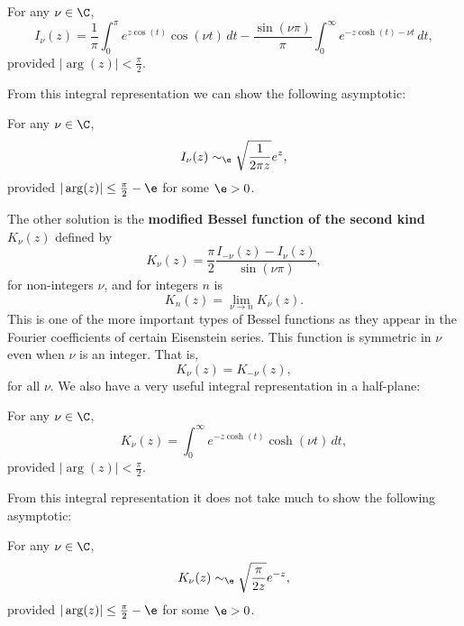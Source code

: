     \begin{proposition}\label{prop:integral_representation_I-Bessel_function}
      For any $\nu \in \C$,
      \[
        I_{\nu}(z) = \frac{1}{\pi}\int_{0}^{\pi}e^{z\cos(t)}\cos(\nu t)\,dt-\frac{\sin(\nu\pi)}{\pi}\int_{0}^{\infty}e^{-z\cosh(t)-\nu t}\,dt,
      \]
      provided $|\arg(z)| < \frac{\pi}{2}$.
    \end{proposition}

    From this integral representation we can show the following asymptotic:

    \begin{lemma}\label{lem:I_Bessel_function_asymptotic}
      For any $\nu \in \C$,
      \[
        I_{\nu}(z) \sim_{\e} \sqrt{\frac{1}{2\pi z}}e^{z},
      \]
      provided $|\arg(z)| \le \frac{\pi}{2}-\e$ for some $\e > 0$.
    \end{lemma}

    The other solution is the \textbf{modified Bessel function of the second kind} $K_{\nu}(z)$ defined by
    \[
      K_{\nu}(z) = \frac{\pi}{2}\frac{I_{-\nu}(z)-I_{\nu}(z)}{\sin(\nu\pi)},
    \]
    for non-integers $\nu$, and for integers $n$ is
    \[
      K_{n}(z)= \lim_{\nu \to n}K_{\nu}(z).
    \]
    This is one of the more important types of Bessel functions as they appear in the Fourier coefficients of certain Eisenstein series. This function is symmetric in $\nu$ even when $\nu$ is an integer. That is,
    \[
      K_{\nu}(z) = K_{-\nu}(z),
    \]
    for all $\nu$. We also have a very useful integral representation in a half-plane:

    \begin{proposition}\label{prop:integral_representation_K-Bessel_function}
      For any $\nu \in \C$,
      \[
        K_{\nu}(z) = \int_{0}^{\infty}e^{-z\cosh(t)}\cosh(\nu t)\,dt,
      \]
      provided $|\arg(z)| < \frac{\pi}{2}$.
    \end{proposition}

    From this integral representation it does not take much to show the following asymptotic:

    \begin{lemma}\label{lem:K_Bessel_function_asymptotic}
      For any $\nu \in \C$,
      \[
        K_{\nu}(z) \sim_{\e} \sqrt{\frac{\pi}{2z}}e^{-z},
      \]
      provided $|\arg(z)| \le \frac{\pi}{2}-\e$ for some $\e > 0$.
    \end{lemma}
